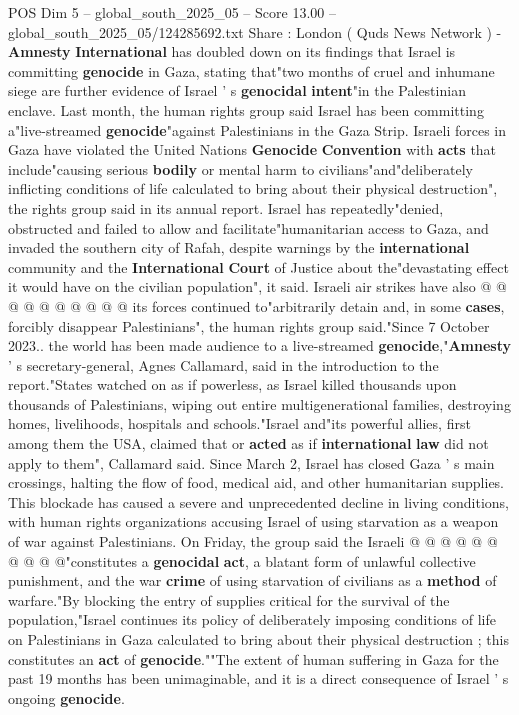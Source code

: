 \begin{textsample}{POS Dim 5 – global\_south\_2025\_05 – Score 13.00 – global\_south\_2025\_05/124285692.txt}  \label{ex:f5_pos_200}
Share : London ( Quds News Network ) - \textbf{Amnesty} \textbf{International} has doubled down on its findings that Israel is committing \textbf{genocide} in Gaza, stating that"two months of cruel and inhumane siege are further evidence of Israel ' s \textbf{genocidal} \textbf{intent}"in the Palestinian enclave.
Last month, the human rights group said Israel has been committing a"live-streamed \textbf{genocide}"against Palestinians in the Gaza Strip.
Israeli forces in Gaza have violated the United Nations \textbf{Genocide} \textbf{Convention} with \textbf{acts} that include"causing serious \textbf{bodily} or mental harm to civilians"and"deliberately inflicting conditions of life calculated to bring about their physical destruction", the rights group said in its annual report.
Israel has repeatedly"denied, obstructed and failed to allow and facilitate"humanitarian access to Gaza, and invaded the southern city of Rafah, despite warnings by the \textbf{international} community and the \textbf{International} \textbf{Court} of Justice about the"devastating effect it would have on the civilian population", it said.
Israeli air strikes have also @ @ @ @ @ @ @ @ @ @ its forces continued to"arbitrarily detain and, in some \textbf{cases}, forcibly disappear Palestinians", the human rights group said."Since 7 October 2023.. the world has been made audience to a live-streamed \textbf{genocide},"\textbf{Amnesty} ' s secretary-general, Agnes Callamard, said in the introduction to the report."States watched on as if powerless, as Israel killed thousands upon thousands of Palestinians, wiping out entire multigenerational families, destroying homes, livelihoods, hospitals and schools."Israel and"its powerful allies, first among them the USA, claimed that or \textbf{acted} as if \textbf{international} \textbf{law} did not apply to them", Callamard said.
Since March 2, Israel has closed Gaza ' s main crossings, halting the flow of food, medical aid, and other humanitarian supplies.
This blockade has caused a severe and unprecedented decline in living conditions, with human rights organizations accusing Israel of using starvation as a weapon of war against Palestinians.
On Friday, the group said the Israeli @ @ @ @ @ @ @ @ @ @"constitutes a \textbf{genocidal} \textbf{act}, a blatant form of unlawful collective punishment, and the war \textbf{crime} of using starvation of civilians as a \textbf{method} of warfare."By blocking the entry of supplies critical for the survival of the population,"Israel continues its policy of deliberately imposing conditions of life on Palestinians in Gaza calculated to bring about their physical destruction ; this constitutes an \textbf{act} of \textbf{genocide}.""The extent of human suffering in Gaza for the past 19 months has been unimaginable, and it is a direct consequence of Israel ' s ongoing \textbf{genocide}.

\end{textsample}
